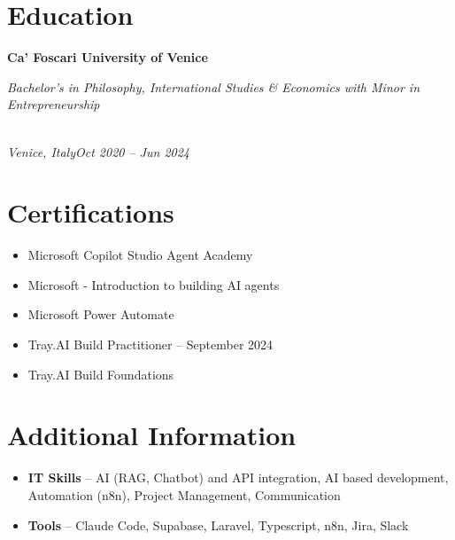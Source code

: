\documentclass[a4paper,10pt]{article}
\newcommand{\role}[4]{\vspace{3pt}\noindent\hspace{0.6em}\parbox[t]{0.38\textwidth}{\raggedright\textbf{#1}}\hfill\parbox[t]{0.58\textwidth}{\raggedleft\textit{#2}}\\{\textit{#3}\hfill\textit{#4}}\vspace{1pt}}
\begin{document}
\section{Education}
\role{Ca' Foscari University of Venice}{Bachelor's in Philosophy, International Studies \& Economics with Minor in Entrepreneurship}{Venice, Italy}{Oct 2020 -- Jun 2024}

\section{Certifications}
\begin{itemize}
\item Microsoft Copilot Studio Agent Academy
\item Microsoft - Introduction to building AI agents
\item Microsoft Power Automate
\item Tray.AI Build Practitioner -- September 2024
\item Tray.AI Build Foundations
\end{itemize}

\section{Additional Information}
\begin{itemize}
\item \textbf{IT Skills} -- AI (RAG, Chatbot) and API integration, AI based development, Automation (n8n), Project Management, Communication
\item \textbf{Tools} -- Claude Code, Supabase, Laravel, Typescript, n8n, Jira, Slack
\end{itemize}
\end{document}
